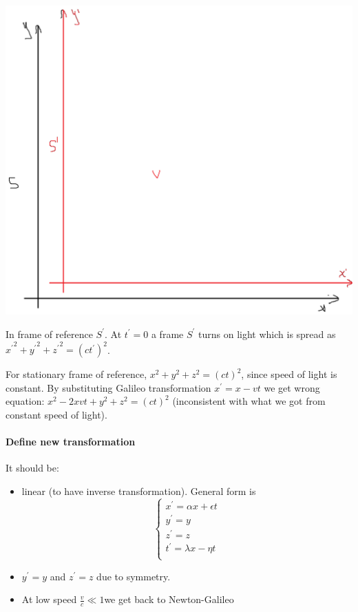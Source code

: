 \begin{center}
	\includegraphics[scale=0.20]{./lect20/pic5.png}
\end{center}

In frame of reference $S^\prime$. At $t^\prime=0$ a frame $S^\prime$ turns on light which is spread as ${x^\prime}^2 + {y^\prime}^2 + {z^\prime}^2 = \left(ct^\prime\right)^2$.

For stationary frame of reference, $x^2+y^2+z^2= \left(ct\right)^2$, since speed of light is constant. By substituting Galileo transformation $x^\prime  =x - vt$ we get wrong equation: $x^2 -2xvt + y^2 + z^2  = \left(ct\right)^2$ (inconsistent with what we got from constant speed of light).


\paragraph{Define new transformation} It should be:

\begin{itemize}
	\item linear (to have inverse transformation). General form is $$\begin{cases*}
		x^\prime = \alpha x + \epsilon t\\
	y^\prime = y\\
	z^\prime = z\\
	t^\prime = \lambda x - \eta t\\
	\end{cases*}$$
	\item $y^\prime = y$ and $z^\prime = z$ due to symmetry.
	\item At low speed $\frac{v}{c} \ll 1$we get back to Newton-Galileo 
\end{itemize}

